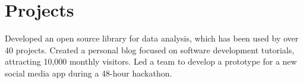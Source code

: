 \section{Projects}
  \resumeSubHeadingListStart
      {Developed an open source library for data analysis, which has been used by over 40 projects.}
      {Created a personal blog focused on software development tutorials, attracting 10,000 monthly visitors.}
      {Led a team to develop a prototype for a new social media app during a 48-hour hackathon.}
  \resumeSubHeadingListEnd